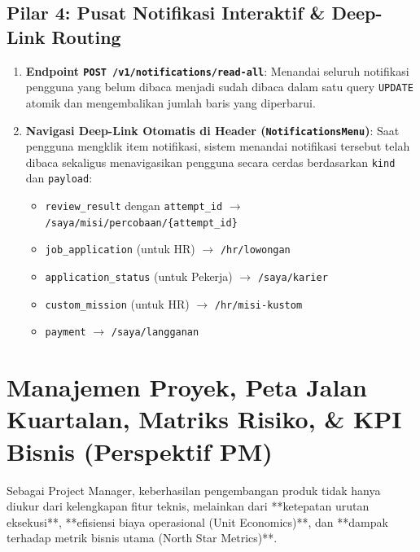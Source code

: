 \documentclass[11pt,a4paper]{report}
\begin{document}
\section{Pilar 4: Pusat Notifikasi Interaktif \& Deep-Link Routing}
\begin{enumerate}[leftmargin=1.5em]
    \item \textbf{Endpoint \texttt{POST /v1/notifications/read-all}}: Menandai seluruh notifikasi pengguna yang belum dibaca menjadi sudah dibaca dalam satu query \texttt{UPDATE} atomik dan mengembalikan jumlah baris yang diperbarui.
    \item \textbf{Navigasi Deep-Link Otomatis di Header (\texttt{NotificationsMenu})}: Saat pengguna mengklik item notifikasi, sistem menandai notifikasi tersebut telah dibaca sekaligus menavigasikan pengguna secara cerdas berdasarkan \texttt{kind} dan \texttt{payload}:
    \begin{itemize}
        \item \texttt{review\_result} dengan \texttt{attempt\_id} $\rightarrow$ \texttt{/saya/misi/percobaan/\{attempt\_id\}}
        \item \texttt{job\_application} (untuk HR) $\rightarrow$ \texttt{/hr/lowongan}
        \item \texttt{application\_status} (untuk Pekerja) $\rightarrow$ \texttt{/saya/karier}
        \item \texttt{custom\_mission} (untuk HR) $\rightarrow$ \texttt{/hr/misi-kustom}
        \item \texttt{payment} $\rightarrow$ \texttt{/saya/langganan}
    \end{itemize}
\end{enumerate}

\chapter{Manajemen Proyek, Peta Jalan Kuartalan, Matriks Risiko, \& KPI Bisnis (Perspektif PM)}

Sebagai Project Manager, keberhasilan pengembangan produk tidak hanya diukur dari kelengkapan fitur teknis, melainkan dari **ketepatan urutan eksekusi**, **efisiensi biaya operasional (Unit Economics)**, dan **dampak terhadap metrik bisnis utama (North Star Metrics)**.
\end{document}
